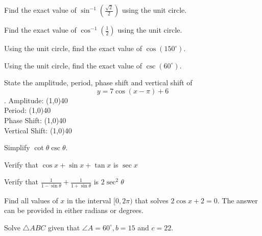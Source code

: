 \documentclass[addpoints]{exam}
\begin{document}
\begin{questions}
    
    \question[1] Find the exact value of $\sin^{-1} (\frac{\sqrt{2}}{2})$ using the unit circle. 
    
    \question[1] Find the exact value of $\cos^{-1} (\frac{1}{2})$ using the unit circle. 
    
    \question[1] Using the unit circle, find the exact value of $\cos(150^\circ)$. 
    
    \question[1] Using the unit circle, find the exact value of $\csc(60^\circ)$. 
    
    \newpage
    \question[1] State the amplitude, period, phase shift and vertical shift of $$y = 7\cos(x - \pi) + 6$$. 
    \newline
    Amplitude: \line(1,0){40} \\
    \newline
    Period: \line(1,0){40} \\
    \newline
    Phase Shift: \line(1,0){40} \\
    \newline
    Vertical Shift: \line(1,0){40}
 
    
    \question[1] Simplify $\cot\theta\csc\theta$. 
    
    \question[1] Verify that $\cos x + \sin x + \tan x$ is $\sec x$ 
    
    \question[1] Verify that $\frac{1}{1 - \sin\theta} + \frac{1}{1 + \sin\theta}$ is $2\sec^2\theta$ 
    
    \question[1] Find all values of $x$ in the interval $[0, 2\pi)$ that solves $2\cos x + 2 = 0$. The answer can be provided in either radians or degrees. 
    
    \newpage
    \question[1] Solve $\triangle ABC$ given that $\angle A = 60^\circ, b = 15$ and $c = 22$. 
    

\end{questions}
\end{document}
